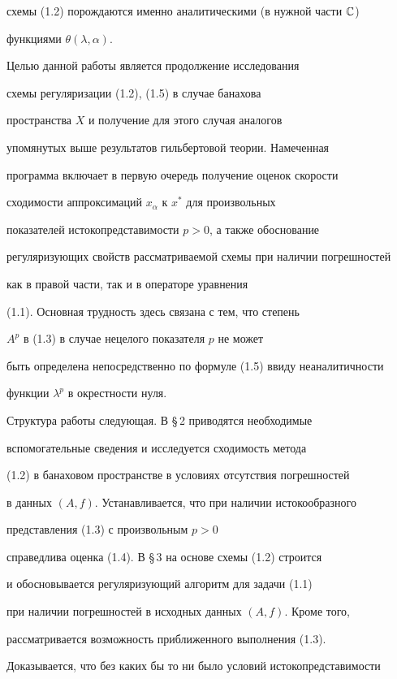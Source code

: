 схемы (1.2) порождаются именно аналитическими (в нужной части $\Bbb C$) 


функциями $\theta(\lambda,\alpha)$. 


 


Целью данной работы является продолжение исследования 


схемы регуляризации (1.2), (1.5) в случае банахова 


пространства $X$ и получение для этого случая аналогов 


упомянутых выше результатов гильбертовой теории. Намеченная 


программа включает в первую очередь получение оценок скорости 


сходимости аппроксимаций $x_\alpha$ к $x^*$ для произвольных 


показателей истокопредставимости $p>0$, а также обоснование 


регуляризующих свойств рассматриваемой схемы при наличии погрешностей 


как в правой части, так и в операторе уравнения 


(1.1). Основная трудность здесь связана с тем, что степень 


$A^p$ в (1.3) в случае нецелого показателя $p$ не может 


быть определена непосредственно по формуле (1.5) ввиду неаналитичности 


функции $\lambda^p$ в окрестности нуля. 


 


Структура работы следующая. В \S\,2 приводятся необходимые 


вспомогательные сведения и исследуется сходимость метода 


(1.2) в банаховом пространстве в условиях отсутствия погрешностей 


в данных $(A,f)$. Устанавливается, что при наличии истокообразного 


представления (1.3) с произвольным $p>0$ 


справедлива оценка (1.4). В \S\,3 на основе схемы (1.2) строится 


и обосновывается регуляризующий алгоритм для задачи (1.1) 


при наличии погрешностей в исходных данных $(A,f)$. Кроме того, 


рассматривается возможность приближенного выполнения (1.3). 


Доказывается, что без каких бы то ни было условий истокопредставимости 


